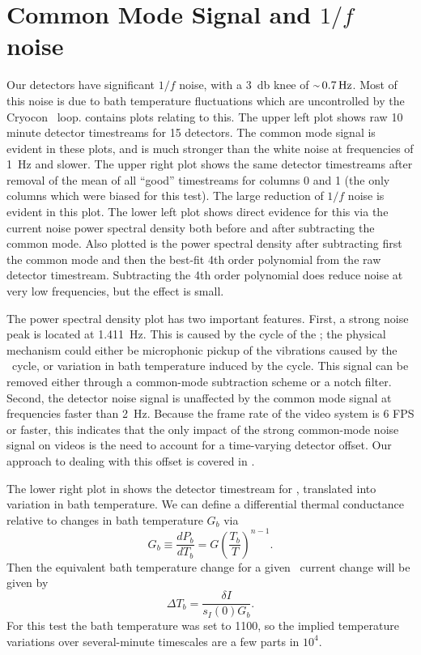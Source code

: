 \section{Common Mode Signal and $1/f$ noise} \label{sec:ch7-common}


Our detectors have significant $1/f$ noise, with a \SI{3}{\decibel} knee of $\abt{\SI{0.7}{\hertz}}$.
Most of this noise is due to bath temperature fluctuations which are uncontrolled by the Cryocon \PID\ loop.
 contains plots relating to this.
The upper left plot shows raw 10 minute detector timestreams for 15 detectors.
The common mode signal is evident in these plots, and is much stronger than the white noise at frequencies of \SI{1}{\Hz} and slower.
The upper right plot shows the same detector timestreams after removal of the mean of all ``good'' timestreams for columns 0 and 1 (the only columns which were biased for this test).
The large reduction of $1/f$ noise is evident in this plot.
The lower left plot shows direct evidence for this via the current noise power spectral density both before and after subtracting the common mode.
Also plotted is the power spectral density after subtracting first the common mode and then the best-fit 4th order polynomial from the raw detector timestream.
Subtracting the 4th order polynomial does reduce noise at very low frequencies, but the effect is small.

The power spectral density plot has two important features.
First, a strong noise peak is located at \SI{1.411}{\Hz}.
This is caused by the  cycle of the \PTC; the physical mechanism could either be microphonic pickup of the vibrations caused by the \PTC\ cycle, or variation in bath temperature induced by the cycle.
This signal can be removed either through a common-mode subtraction scheme or a notch filter.
Second, the detector noise signal is unaffected by the common mode signal at frequencies faster than \SI{2}{\Hz}.
Because the frame rate of the video system is 6 FPS or faster, this indicates that the only impact of the strong common-mode noise signal on videos is the need to account for a time-varying detector offset.
Our approach to dealing with this offset is covered in .

The lower right plot in  shows the detector timestream for , translated into variation in bath temperature.
We can define a differential thermal conductance relative to changes in bath temperature $G_b$ via
\begin{equation}
  G_b \equiv \frac{dP_b}{d T_b} = G \left( \frac{T_b}{T} \right)^{n-1}.
\end{equation}
Then the equivalent bath temperature change for a given \TES\ current change will be given by
\begin{equation}
  \Delta T_b = \frac{\delta I}{s_I(0) G_b}.
\end{equation}
For this test the bath temperature was set to \SI{1100}{\mK}, so the implied temperature variations over several-minute timescales are a few parts in $10^{4}$.

